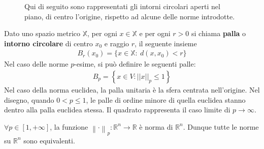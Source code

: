 \documentclass[a4paper, oneside]{book}
\begin{document}
\begin{figure}[H]
    \centering
    \caption{Qui di seguito sono rappresentati gli intorni circolari aperti nel piano, di centro
l'origine, rispetto ad alcune delle norme introdotte.}
\end{figure}
\begin{definition}
    Dato uno spazio metrico $\mathbb{X}$, per ogni $x \in \mathbb{X}$ e per ogni $r > 0$ 
    si chiama \textbf{palla} o \textbf{intorno circolare} di centro 
    $x_0$ e raggio $r$, il seguente insieme
    \begin{align}
        B_r(x_0) = \{x \in \mathbb{X} : \ d(x, x_0) < r\}
    \end{align}
    Nel caso delle norme $p$-esime, si può definire le seguenti palle:
    \begin{align}
        B_p = \left\{x \in V  : ||x||_p \leq 1\right\}
    \end{align}
    Nel caso della norma euclidea, la palla unitaria è
    la sfera centrata nell'origine. Nel disegno, quando $ 0 < p \leq 1$,
    le palle di ordine minore di quella euclidea stanno dentro alla palla euclidea 
    stessa. Il quadrato rappresenta il caso limite di $p \to \infty $. 
\end{definition}

\begin{theorem}
    $\forall p \in [1, +\infty]$, la funzione $\left\lVert \cdot  \right\rVert _p :\mathbb{R}^{n} \to \mathbb{R}$
    è norma di $\mathbb{R}^{n}$. Dunque tutte le norme su $\mathbb{R}^{n}$ sono equivalenti.
\end{theorem}
\end{document}

